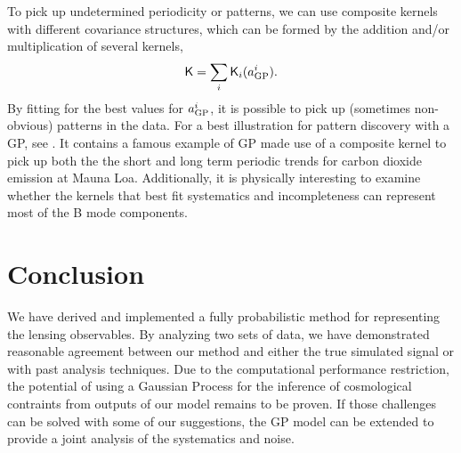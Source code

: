 To pick up undetermined periodicity or patterns, 
we can use composite kernels with different covariance structures, 
which can be formed by the addition and/or multiplication of several kernels,
\begin{equation}
	\mathsf{K} = \sum_i \mathsf{K}_i(a_{\rm GP}^i).
\end{equation}
By fitting for the best values for $a_{\rm GP}^i$, it is possible  
to pick up (sometimes non-obvious) patterns in the data. 
For a best illustration for pattern discovery with a GP, see
\cite{Duvenaud2013}.
It contains a famous example of GP made use of a composite kernel to pick up both the 
the short and long term periodic trends for carbon dioxide emission at Mauna Loa.
Additionally, it is physically interesting to examine whether the kernels that best 
fit systematics and incompleteness can represent most of the B mode components. 





\section{Conclusion}
We have derived and implemented a fully probabilistic method for 
representing the lensing observables. By analyzing two sets of data, 
we have demonstrated reasonable agreement between our method and either the true
simulated signal or with past analysis techniques.  
Due to the computational performance restriction,  
the potential of using a Gaussian Process for the inference of cosmological
contraints from outputs of our model remains to be proven. 
If those challenges can be solved with some of our
suggestions, the GP model can be 
extended to provide a joint analysis of the systematics and noise. 


